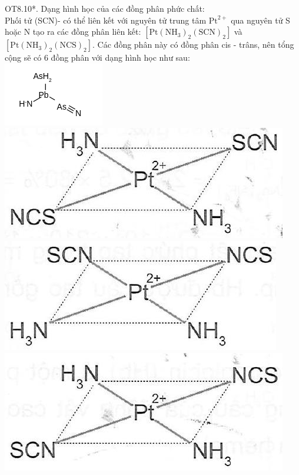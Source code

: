 \documentclass[10pt]{article}
\begin{document}
OT8.10*. Dạng hình học của các đồng phân phức chất:\\
Phối tử (SCN)- có thể liên kết với nguyên tử trung tâm $\mathrm{Pt}^{2+}$ qua nguyên tử S hoặc N tạo ra các đồng phân liên kết: $\left[\mathrm{Pt}\left(\mathrm{NH}_{3}\right)_{2}(\mathrm{SCN})_{2}\right]$ và $\left[\mathrm{Pt}\left(\mathrm{NH}_{3}\right)_{2}(\mathrm{NCS})_{2}\right]$. Các đồng phân này có đồng phân cis - trâns, nên tổng cộng sẽ có 6 đồng phân với dạng hình học như sau:\\
\includegraphics{smile-3f3bd82c5f38896ba754e5a909d5dbff8b1fd883}\\
\includegraphics[max width=\textwidth, center]{2025_10_23_b4e16b74380d0f7e7700g-123(2)}\\
\includegraphics[max width=\textwidth, center]{2025_10_23_b4e16b74380d0f7e7700g-123}\\
\includegraphics[max width=\textwidth, center]{2025_10_23_b4e16b74380d0f7e7700g-123(1)}\\
\end{document}
